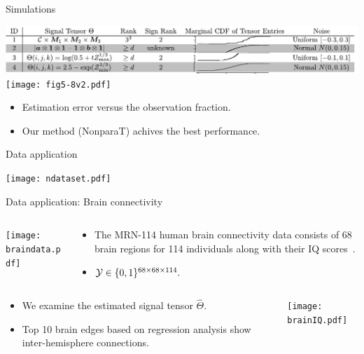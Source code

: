 \documentclass[10pt, mathserif]{beamer} %
\theoremstyle{definition}
\theoremstyle{plain}
\begin{document}
\begin{frame}{Simulations}
    \begin{center}
    \includegraphics[width = \textwidth]{simulation.pdf}
    \texttt{[image: fig5-8v2.pdf]}
    \end{center}
    \begin{itemize}
        \item Estimation error versus the observation fraction.
        \item Our method (NonparaT) achives the best performance.
    \end{itemize}
\end{frame}

\begin{frame}{Data application}
    \begin{center}
    \texttt{[image: ndataset.pdf]}
    \end{center}
\end{frame}

\begin{frame}{Data application: Brain connectivity}
\begin{columns}
\begin{column}{0.21\textwidth}
   \begin{center}
     \texttt{[image: braindata.pdf]}
     \end{center}
\end{column}
\begin{column}{0.7\textwidth} 
\begin{itemize}
    \item The MRN-114 human brain connectivity data consists of 68 brain regions for 114 individuals along with their IQ scores~\citep{wang2017bayesian}.
    \item  $\mathcal{Y}\in\{0,1\}^{68\times68\times114}.$
\end{itemize}
\end{column}
\end{columns}

\begin{columns}
\begin{column}{0.6\textwidth}
 \begin{itemize}
     \item We examine the estimated signal tensor $\hat\Theta.$
     \item Top 10 brain edges based on regression analysis show inter-hemisphere connections.
 \end{itemize}
\end{column}
\begin{column}{0.4\textwidth} 
   \begin{center}
     \texttt{[image: brainIQ.pdf]}
     \end{center}
\end{column}
\end{columns}

\end{frame}
\end{document}
